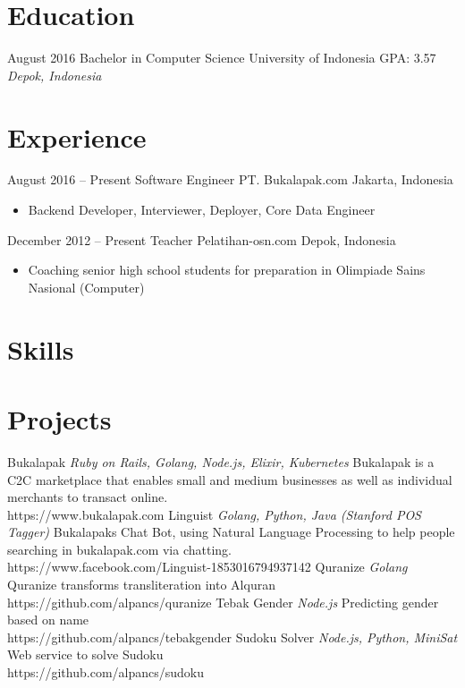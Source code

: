 \documentclass[letterpaper]{moderncv}        %
\begin{document}
\title{}
\makecvtitle
\section{Education}
\cventry
{August 2016}
{Bachelor in Computer Science}
{University of Indonesia}
{GPA: 3.57}
{\textit{Depok, Indonesia}}
{}
\section{Experience}
\cventry
{August 2016 -- Present}
{Software Engineer}
{PT. Bukalapak.com}
{Jakarta, Indonesia}
{}
{\begin{itemize}%
	\item Backend Developer, Interviewer, Deployer, Core Data Engineer
	\end{itemize}}
\cventry
{December 2012 -- Present}
{Teacher}
{Pelatihan-osn.com}
{Depok, Indonesia}
{}
{\begin{itemize}%
	\item Coaching senior high school students for preparation in Olimpiade Sains Nasional (Computer)
	\end{itemize}}
\section{Skills}
\section{Projects}
\cventry
{}
{Bukalapak}
{}
{\textit{Ruby on Rails, Golang, Node.js, Elixir, Kubernetes}}
{}
{Bukalapak is a C2C marketplace that enables small and medium businesses as well as individual merchants to transact online.\\https://www.bukalapak.com}
\vspace{1mm}
\cventry
{}
{Linguist}
{}
{\textit{Golang, Python, Java (Stanford POS Tagger)}}
{}
{Bukalapak\textquotesingle{}s Chat Bot, using Natural Language Processing to help people searching in bukalapak.com via chatting.\\https://www.facebook.com/Linguist-1853016794937142}
\vspace{1mm}
\cventry
{}
{Quranize}
{}
{\textit{Golang}}
{}
{Quranize transforms transliteration into Alquran\\https://github.com/alpancs/quranize}
\vspace{1mm}
\cventry
{}
{Tebak Gender}
{}
{\textit{Node.js}}
{}
{Predicting gender based on name\\https://github.com/alpancs/tebakgender}
\vspace{1mm}
\cventry
{}
{Sudoku Solver}
{}
{\textit{Node.js, Python, MiniSat}}
{}
{Web service to solve Sudoku\\https://github.com/alpancs/sudoku}
\vspace{1mm}
\end{document}
